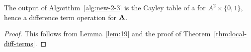 \begin{prop}
  The output of Algorithm~\ref{alg:new-2-3} is the Cayley table of a \ldto for $A^2 \times \{0,1\}$, hence a difference term operation for $\mathbf{A}$.
\end{prop}

\begin{proof}
This follows from Lemma~\ref{lem:19} and the proof of Theorem~\ref{thm:local-diff-terms}.
\end{proof}


  
  





























